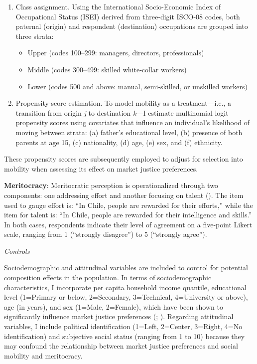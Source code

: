 \documentclass[
  12pt,
]{article}
\providecommand{\tightlist}{%
  \setlength{\itemsep}{0pt}\setlength{\parskip}{0pt}}\usepackage{longtable,booktabs,array}
\begin{document}
\begin{enumerate}
\def\labelenumi{\arabic{enumi}.}
\item
  Class assignment. Using the International Socio-Economic Index of
  Occupational Status (ISEI) derived from three-digit ISCO-08 codes,
  both paternal (origin) and respondent (destination) occupations are
  grouped into three strata:

  \begin{itemize}
  \tightlist
  \item
    Upper (codes 100--299: managers, directors, professionals)
  \item
    Middle (codes 300--499: skilled white‑collar workers)
  \item
    Lower (codes 500 and above: manual, semi‑skilled, or unskilled
    workers)
  \end{itemize}
\item
  Propensity-score estimation. To model mobility as a treatment---i.e.,
  a transition from origin \emph{j} to destination \emph{k}---I estimate
  multinomial logit propensity scores using covariates that influence an
  individual's likelihood of moving between strata: (a) father's
  educational level, (b) presence of both parents at age 15, (c)
  nationality, (d) age, (e) sex, and (f) ethnicity.
\end{enumerate}

These propensity scores are subsequently employed to adjust for
selection into mobility when assessing its effect on market justice
preferences.

\textbf{Meritocracy}: Meritocratic perception is operationalized through
two components: one addressing effort and another focusing on talent
(). The item used to gauge
effort is: ``In Chile, people are rewarded for their efforts,'' while
the item for talent is: ``In Chile, people are rewarded for their
intelligence and skills.'' In both cases, respondents indicate their
level of agreement on a five-point Likert scale, ranging from 1
(``strongly disagree'') to 5 (``strongly agree'').

\emph{Controls}

Sociodemographic and attitudinal variables are included to control for
potential composition effects in the population. In terms of
sociodemographic characteristics, I incorporate per capita household
income quantile, educational level (1=Primary or below, 2=Secondary,
3=Technical, 4=University or above), age (in years), and sex (1=Male,
2=Female), which have been shown to significantly influence market
justice preferences (; ). Regarding
attitudinal variables, I include political identification (1=Left,
2=Center, 3=Right, 4=No identification) and subjective social status
(ranging from 1 to 10) because they may confound the relationship
between market justice preferences and social mobility and meritocracy.
\end{document}
